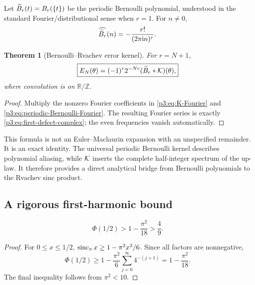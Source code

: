 \documentclass[11pt,oneside]{article}
\numberwithin{equation}{section}
\newtheorem{theorem}{Theorem}[section]
\theoremstyle{definition}
\theoremstyle{remark}
\newcommand{\R}{\mathbb R}
\newcommand{\Z}{\mathbb Z}
\begin{document}
Let $\widetilde B_r(t)=B_r(\{t\})$ be the periodic Bernoulli polynomial, understood in the standard Fourier/distributional sense when $r=1$.  For $n\ne0$,
\begin{equation}
 \widehat{\widetilde B_r}(n)=-\frac{r!}{(2\pi\mathrm i n)^r}.
 \label{p3:eq:periodic-Bernoulli-Fourier}
\end{equation}

\begin{theorem}[Bernoulli--Rvachev error kernel]
\label{p3:thm:Bernoulli-convolution}
For $r=N+1$,
\begin{equation}
 \boxed{\displaystyle
 E_N(\theta)=(-1)^r2^{-Nr}
 (\widetilde B_r*\mathcal K)(\theta),}
 \label{p3:eq:Bernoulli-convolution}
\end{equation}
where convolution is on $\R/\Z$.
\end{theorem}

\begin{proof}
Multiply the nonzero Fourier coefficients in \eqref{p3:eq:K-Fourier} and \eqref{p3:eq:periodic-Bernoulli-Fourier}.  The resulting Fourier series is exactly \eqref{p3:eq:first-defect-complex}; the even frequencies vanish automatically.
\end{proof}

\begin{remark}
This formula is not an Euler--Maclaurin expansion with an unspecified remainder.  It is an exact identity.  The universal periodic Bernoulli kernel describes polynomial aliasing, while $\mathcal K$ inserts the complete half-integer spectrum of the up-law.  It therefore provides a direct analytical bridge from Bernoulli polynomials to the Rvachev sinc product.
\end{remark}

\subsection{A rigorous first-harmonic bound}

\begin{lemma}
\label{p3:lem:phi-half-lower}
\begin{equation}
 \Phi(1/2)>1-\frac{\pi^2}{18}>\frac49.
 \label{p3:eq:phi-half-lower}
\end{equation}
\end{lemma}

\begin{proof}
For $0\le x\le1/2$, $\operatorname{sinc}_{\pi} x\ge1-\pi^2x^2/6$.  Since all factors are nonnegative,
\[
 \Phi(1/2)
 \ge1-\frac{\pi^2}{6}\sum_{j=0}^{\infty}4^{-(j+1)}
 =1-\frac{\pi^2}{18}.
\]
The final inequality follows from $\pi^2<10$.
\end{proof}
\end{document}
